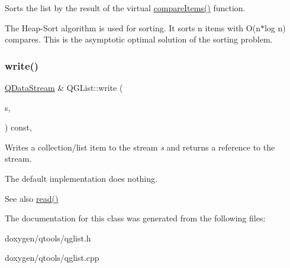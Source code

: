 Sorts the list by the result of the virtual \mbox{\hyperlink{class_q_g_list_a9a9c5fa3888371979c12e3207b3f9ec5}{compare\+Items()}} function.

The Heap-\/\+Sort algorithm is used for sorting. It sorts n items with O(n$\ast$log n) compares. This is the asymptotic optimal solution of the sorting problem. \mbox{\label{class_q_g_list_a6804cb8250461f60694d80debb473855}} 
\subsubsection{\texorpdfstring{write()}{write()}}
{\footnotesize\ttfamily \mbox{\hyperlink{class_q_data_stream}{Q\+Data\+Stream}} \& Q\+G\+List\+::write (\begin{DoxyParamCaption}\item[{\mbox{\hyperlink{class_q_data_stream}{Q\+Data\+Stream}} \&}]{s,  }\item[{Q\+Collection\+::\+Item}]{ }\end{DoxyParamCaption}) const\hspace{0.3cm}{\ttfamily [protected]}, {\ttfamily [virtual]}}

Writes a collection/list item to the stream {\itshape s} and returns a reference to the stream.

The default implementation does nothing.

\begin{DoxySeeAlso}{See also}
\mbox{\hyperlink{structcmd_8h_a9c7b76d5266903891c803132d51ccb90}{read()}} 
\end{DoxySeeAlso}


The documentation for this class was generated from the following files\+:\begin{DoxyCompactItemize}
\item 
doxygen/qtools/qglist.\+h\item 
doxygen/qtools/qglist.\+cpp\end{DoxyCompactItemize}
